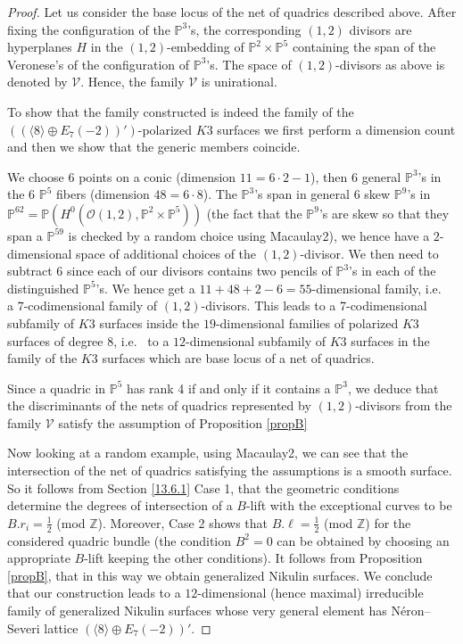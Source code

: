 \documentclass{amsart}
\theoremstyle{definition}
\numberwithin{equation}{section}
\numberwithin{equation}{section} \theoremstyle{definition}
\newcommand\PP{{\mathbb{P}}}
\newcommand\oo{\mathcal O}
\begin{document}
\begin{proof}
 Let us consider the base locus of the net of quadrics described above. After fixing the configuration of the $\PP^3$'s, the corresponding $(1,2)$ divisors are hyperplanes $H$ in the $(1,2)$-embedding of $\mathbb P^2 \times \mathbb P^5$ containing the span of the Veronese's of the configuration of $\PP^3$'s. 
 The space of $(1,2)$-divisors as above is denoted by $\mathcal{V}$.
Hence, the family $\mathcal{V}$ is unirational.  
    
To show that the family constructed is indeed the family of the $\left(\left(\langle 8\rangle\oplus E_7(-2)\right)'\right)$-polarized $K3$ surfaces we first perform a dimension count and then we show that the generic members coincide.

 We choose 6 points on a conic (dimension $11=6\cdot 2-1$),  then 6 general $\mathbb{P}^3$'s in the 6 $\mathbb{P}^5$ fibers (dimension $48=6\cdot8$). The $\mathbb{P}^3$'s span in general 6 skew $\mathbb P^9$'s in $\mathbb P^{62}=\mathbb P(H^0(\oo(1,2), \mathbb P^2\times \mathbb P^5))$ (the fact that the $\mathbb P^9$'s are skew so that they span a $\mathbb P^{59}$ is checked by a random choice using Macaulay2), we hence have a $2$-dimensional space of additional choices of the $(1,2)$-divisor. We then need to subtract 6 since each of our divisors contains two pencils of $\mathbb{P}^3$'s in each of the distinguished $\mathbb P^5$'s. We hence get a $11+48+2-6=55$-dimensional family, i.e.~  a $7$-codimensional family of $(1,2)$-divisors. This leads to a 7-codimensional subfamily of $K3$ surfaces inside the $19$-dimensional families of polarized $K3$ surfaces of  degree 8, i.e.~ to a $12$-dimensional subfamily of $K3$ surfaces in the family of the $K3$ surfaces which are base locus of a net of quadrics.

    Since a quadric in $\mathbb P^5$ has rank 4 if and only if it contains a $\mathbb{P}^3$, we deduce that the discriminants of the nets of quadrics represented by $(1,2)$-divisors from the family $\mathcal V$ satisfy the assumption of Proposition \ref{propB}
    
     Now looking at a random example, using Macaulay2, we can see that the intersection of the net of quadrics satisfying the assumptions is a smooth surface.  
    So it follows from  Section \ref{13.6.1} Case 1, that the geometric conditions determine the degrees of intersection of a $B$-lift with the exceptional curves to be $B.r_i=\frac{1}{2}$ (mod $\mathbb{Z}$). Moreover, Case 2 shows that $B.\ell=\frac{1}{2}$ (mod $\mathbb{Z}$) for the considered quadric bundle (the condition $B^2=0$ can be obtained by choosing an appropriate $B$-lift keeping the other conditions).
It follows from Proposition \ref{propB}, that in this way we obtain generalized Nikulin surfaces.
We conclude that our construction leads to a $12$-dimensional (hence maximal)  irreducible family of generalized Nikulin surfaces whose very general element has N\'eron--Severi lattice $\left(\langle 8\rangle\oplus E_7(-2)\right)'$.
\end{proof}
\end{document}
